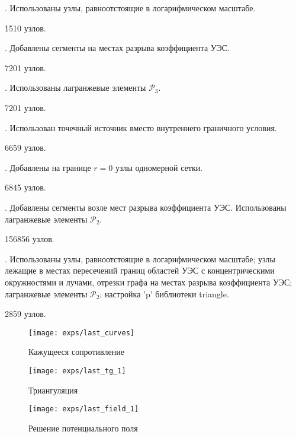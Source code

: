 
 \theexp.
Использованы узлы, равноотстоящие в логарифмическом масштабе.

1510 узлов.


 \theexp.
Добавлены сегменты на местах разрыва коэффициента УЭС.

7201 узлов.


 \theexp.
Использованы лагранжевые элементы ${\mathcal{P}_3}$.

7201 узлов.


 \theexp \label{optimal}.
Использован точечный источник вместо внутреннего граничного условия.

6659 узлов.


 \theexp.
Добавлены на границе ${r = 0}$ узлы одномерной сетки.

6845 узлов.


 \theexp.
Добавлены сегменты возле мест разрыва коэффициента УЭС. Использованы лагранжевые элементы ${\mathcal{P}_2}$.

156856 узлов.


 \theexp \label{best}.
Использованы узлы, равноотстоящие в логарифмическом масштабе;
узлы лежащие в местах пересечений границ областей УЭС с концентрическими окружностями и лучами,
отрезки графа на местах разрыва коэффициента УЭС; лагранжевые элементы ${\mathcal{P}_2}$; настройка 'p' библиотеки triangle.

2859 узлов.

\begin{figure}[H]
\texttt{[image: exps/last\_curves]}
\caption{Кажущееся сопротивление}
\end{figure}

\begin{figure}[H]
\texttt{[image: exps/last\_tg\_1]}
\caption{Триангуляция}
\end{figure}

\begin{figure}[H]
\texttt{[image: exps/last\_field\_1]}
\caption{Решение потенциального поля}
\end{figure}

